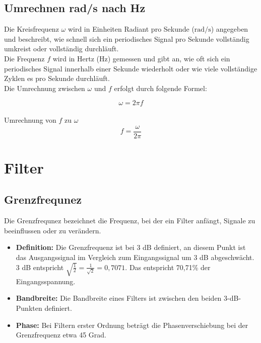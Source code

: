 \subsection{Umrechnen rad/s nach Hz}

Die Kreisfrequenz \( \omega \) wird in Einheiten Radiant pro Sekunde (\(
\text{rad/s} \)) angegeben und beschreibt, wie schnell sich ein periodisches
Signal pro Sekunde vollständig umkreist oder vollständig durchläuft. \\ Die
Frequenz \( f \) wird in Hertz (\( \text{Hz} \)) gemessen und gibt an, wie oft
sich ein periodisches Signal innerhalb einer Sekunde wiederholt oder wie viele
vollständige Zyklen es pro Sekunde durchläuft. \\ Die Umrechnung zwischen \(
\omega \) und \( f \) erfolgt durch folgende Formel:

\[
    \omega = 2 \pi f
\]
\\
Umrechnung von \( f \) zu \( \omega \)
\[
    f = \frac{\omega}{2 \pi}
\]

\section{Filter}
\subsection{Grenzfrequnez}
Die Grenzfrequnez bezeichnet die Frequenz, bei der ein Filter anfängt, Signale
zu beeinflussen oder zu verändern.
\begin{itemize}

    \item \textbf{Definition:} Die Grenzfrequenz ist bei 3 dB definiert, an diesem Punkt ist das Ausgangssignal im Vergleich zum Eingangssignal um 3 dB abgeschwächt. 3 dB entspricht $\sqrt{\frac{1}{2}} = \frac{1}{\sqrt{2}} = 0,7071$. Das entspricht 70,71\% der Eingangsspannung.

    \item \textbf{Bandbreite:} Die Bandbreite eines Filters ist zwischen den beiden 3-dB-Punkten definiert.

    \item \textbf{Phase:} Bei Filtern erster Ordnung beträgt die Phasenverschiebung bei der Grenzfrequenz etwa 45 Grad.

\end{itemize}
\newpage
